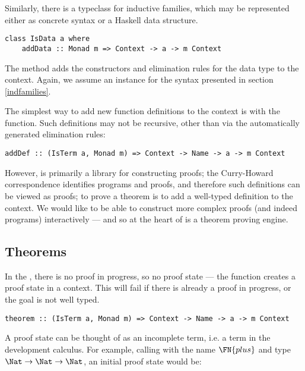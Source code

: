 Similarly, there is a typeclass for inductive families,
which may be represented either as concrete syntax or a Haskell data
structure.

\begin{verbatim}
class IsData a where
    addData :: Monad m => Context -> a -> m Context
\end{verbatim}

The  method adds the constructors and elimination
rules for the data type to the context. Again, we assume an instance
for the syntax presented in section \ref{indfamilies}.

The simplest way to add new function definitions to the context is
with the  function. Such definitions may not be recursive,
other than via the automatically generated elimination rules:

\begin{verbatim}
addDef :: (IsTerm a, Monad m) => Context -> Name -> a -> m Context
\end{verbatim}

However, \Ivor{} is primarily a library for constructing proofs; the
Curry-Howard correspondence identifies programs and proofs, and
therefore such definitions can be viewed as proofs; to prove a
theorem is to add a well-typed definition to the context.  We would
like to be able to construct more complex proofs (and indeed
programs) interactively --- and so at the heart of \Ivor{} is a theorem
proving engine.

\subsection{Theorems}

In the , there is no proof in progress, so no
proof state --- the  function creates a proof state in
a context. This will fail if there is already a proof in progress, or
the goal is not well typed.

\begin{verbatim}
theorem :: (IsTerm a, Monad m) => Context -> Name -> a -> m Context
\end{verbatim}

A proof state can be thought of as an incomplete term, i.e. a
term in the development calculus. 
For example, calling 
with the name $\FN{plus}$ and type $\Nat\to\Nat\to\Nat$, an initial
proof state would be:


